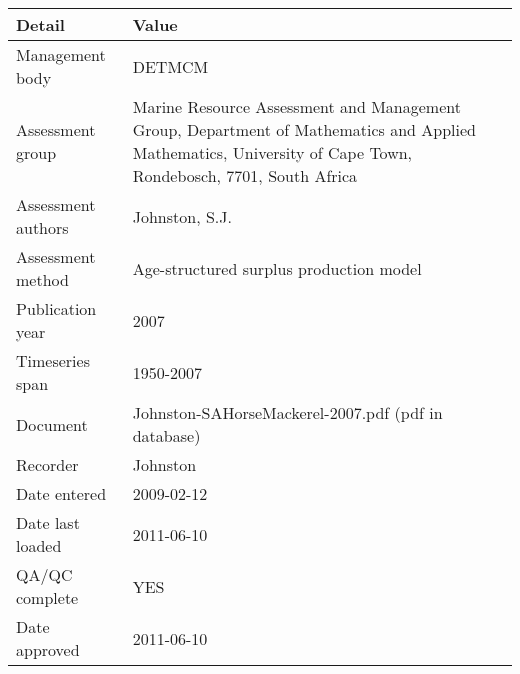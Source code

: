 \begin{table}[htb]
\centering
\begin{tabular}{lp{7cm}}
\toprule
Detail & Value \\
\midrule
Management body    & DETMCM                                                                                                                                                      \\
Assessment group   & Marine Resource Assessment and Management Group, Department of Mathematics and Applied Mathematics, University of Cape Town, Rondebosch, 7701, South Africa \\
Assessment authors & Johnston, S.J.                                                                                                                                              \\
Assessment method  & Age-structured surplus production model                                                                                                                     \\
Publication year   & 2007                                                                                                                                                        \\
Timeseries span    & 1950-2007                                                                                                                                                   \\
Document           & Johnston-SAHorseMackerel-2007.pdf (pdf in database)                                                                                                         \\
Recorder           & Johnston                                                                                                                                                    \\
Date entered       & 2009-02-12                                                                                                                                                  \\
Date last loaded   & 2011-06-10                                                                                                                                                  \\
QA/QC complete     & YES                                                                                                                                                         \\
Date approved      & 2011-06-10                                                                                                                                                  \\
\bottomrule
\end{tabular}
\label{tab:assessdet}
\end{table}
